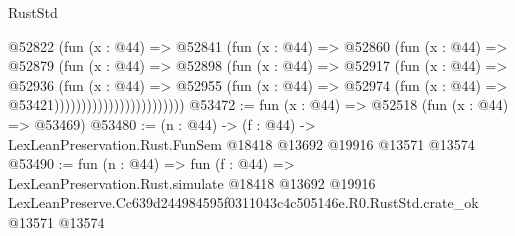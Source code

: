\begin{lexlean}{RustStd}
\begin{coremodule}
                                @52822
                                  (fun (x : @44) =>
                                  @52841
                                    (fun (x : @44) =>
                                    @52860
                                      (fun (x : @44) =>
                                      @52879
                                        (fun (x : @44) =>
                                        @52898
                                          (fun (x : @44) =>
                                          @52917
                                            (fun (x : @44) =>
                                            @52936
                                              (fun (x : @44) =>
                                              @52955
                                                (fun (x : @44) =>
                                                @52974
                                                  (fun (x : @44) => @53421))))))))))))))))))))))))
@53472 := fun (x : @44) => @52518 (fun (x : @44) => @53469)
@53480 := (n : @44) ->
  (f : @44) -> LexLeanPreservation.Rust.FunSem @18418 @13692 @19916 @13571 @13574
@53490 := fun (n : @44) =>
  fun (f : @44) =>
  LexLeanPreservation.Rust.simulate
    @18418
    @13692
    @19916
    LexLeanPreserve.Cc639d244984595f0311043c4c505146e.R0.RustStd.crate_ok
    @13571
    @13574
\end{coremodule}
\end{lexlean}
